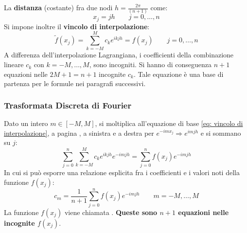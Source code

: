 \highspace
La \textbf{distanza} (costante) fra due nodi $h = \frac{2\pi}{\left(n+1\right)}$ come:
\begin{equation*}
	x_{j} = jh \hspace{2em} j = 0, \dots, n
\end{equation*}
Si impone inoltre il \textbf{vincolo di interpolazione}:
\begin{equation}\label{eq: vincolo di interpolazione}
	\tilde{f}\left(x_{j}\right) = \displaystyle\sum_{k = -M}^{M} c_{k}e^{ikjh} = f\left(x_{j}\right) \hspace{2em} j = 0, \dots, n
\end{equation}
A differenza dell'interpolazione Lagrangiana, i coefficienti della combinazione lineare $c_{k}$ con $k = -M, \dots, M$, sono incogniti. Si hanno di conseguenza $n+1$ equazioni nelle $2M + 1 = n+1$ incognite $c_{k}$. Tale equazione è una base di partenza per le formule nei paragrafi successivi.

\newpage

\subsubsection{Trasformata Discreta di Fourier}

Dato un intero $m \in \left[-M, M\right]$, si moltiplica all'equazione di base \ref{eq: vincolo di interpolazione}, a pagina \pageref{eq: vincolo di interpolazione}, a sinistra e a destra per $e^{-imx_{j}} \Rightarrow e^{imjh}$ e si sommano su $j$:
\begin{equation}
	\displaystyle\sum_{j=0}^{n}\sum_{k=-M}^{M} c_{k} e^{ikjh} e^{-imjh} = \sum_{j=0}^{n} f\left(x_{j}\right) e^{-imjh}
\end{equation}
In cui si può esporre una relazione esplicita fra i coefficienti e i valori noti della funzione $f\left(x_{j}\right)$:
\begin{equation}
	c_{m} = \dfrac{1}{n+1} \displaystyle\sum_{j=0}^{n} f\left(x_{j}\right) e^{-imjh} \hspace{2em} m = -M, \dots, M
\end{equation}
La funzione $f\left(x_{j}\right)$ viene chiamata . \textbf{Queste sono $n+1$ equazioni nelle incognite $f\left(x_{j}\right)$}.

